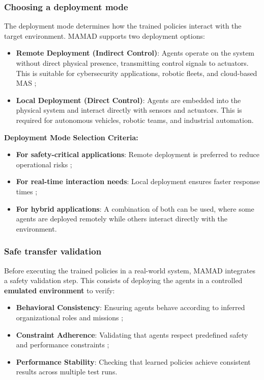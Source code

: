\documentclass[pdflatex,sn-mathphys-num]{sn-jnl}%
\theoremstyle{thmstyleone}%
\theoremstyle{thmstyletwo}%
\theoremstyle{thmstylethree}%
\begin{document}
\subsubsection{Choosing a deployment mode}
The deployment mode determines how the trained policies interact with the target environment. MAMAD supports two deployment options:

\begin{itemize}
    \item \textbf{Remote Deployment (Indirect Control)}: Agents operate on the system without direct physical presence, transmitting control signals to actuators. This is suitable for cybersecurity applications, robotic fleets, and cloud-based MAS ;
    \item \textbf{Local Deployment (Direct Control)}: Agents are embedded into the physical system and interact directly with sensors and actuators. This is required for autonomous vehicles, robotic teams, and industrial automation.
\end{itemize}

\noindent \textbf{Deployment Mode Selection Criteria:}
\begin{itemize}
    \item \textbf{For safety-critical applications}: Remote deployment is preferred to reduce operational risks ;
    \item \textbf{For real-time interaction needs}: Local deployment ensures faster response times ;
    \item \textbf{For hybrid applications}: A combination of both can be used, where some agents are deployed remotely while others interact directly with the environment.
\end{itemize}

\subsubsection{Safe transfer validation}
Before executing the trained policies in a real-world system, MAMAD integrates a safety validation step. This consists of deploying the agents in a controlled \textbf{emulated environment} to verify:
\begin{itemize}
    \item \textbf{Behavioral Consistency}: Ensuring agents behave according to inferred organizational roles and missions ;
    \item \textbf{Constraint Adherence}: Validating that agents respect predefined safety and performance constraints ;
    \item \textbf{Performance Stability}: Checking that learned policies achieve consistent results across multiple test runs.
\end{itemize}
\end{document}
